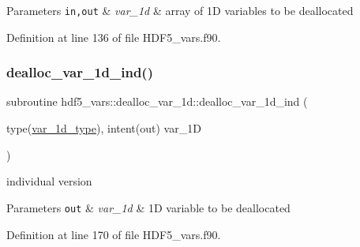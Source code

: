 \begin{DoxyParams}[1]{Parameters}
\mbox{\tt in,out}  & {\em var\+\_\+1d} & array of 1D variables to be deallocated \\
\hline
\end{DoxyParams}


Definition at line 136 of file H\+D\+F5\+\_\+vars.\+f90.

\mbox{\label{interfacehdf5__vars_1_1dealloc__var__1d_ab6fbec4aba8db8df2e3a7fbdd0f30fd5}} 
\subsubsection{\texorpdfstring{dealloc\+\_\+var\+\_\+1d\+\_\+ind()}{dealloc\_var\_1d\_ind()}}
{\footnotesize\ttfamily subroutine hdf5\+\_\+vars\+::dealloc\+\_\+var\+\_\+1d\+::dealloc\+\_\+var\+\_\+1d\+\_\+ind (\begin{DoxyParamCaption}\item[{type(\hyperlink{structhdf5__vars_1_1var__1d__type}{var\+\_\+1d\+\_\+type}), intent(out)}]{var\+\_\+1D }\end{DoxyParamCaption})}



individual version 


\begin{DoxyParams}[1]{Parameters}
\mbox{\tt out}  & {\em var\+\_\+1d} & 1D variable to be deallocated \\
\hline
\end{DoxyParams}


Definition at line 170 of file H\+D\+F5\+\_\+vars.\+f90.



